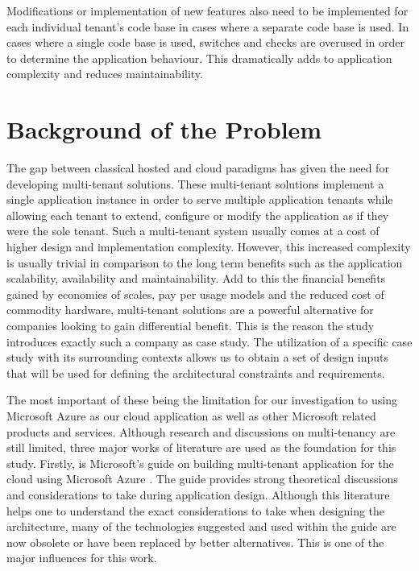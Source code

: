 Modifications or implementation of new features also need to be implemented for each individual tenant's code base in cases where a separate code base is used. In cases where a single code base is used, switches and checks are overused in order to determine the application behaviour. This dramatically adds to application complexity and reduces maintainability.

\section{Background of the Problem}
The gap between classical hosted and cloud paradigms has given the need for developing multi-tenant solutions. These multi-tenant solutions implement a single application instance in order to serve multiple application tenants while allowing each tenant to extend, configure or modify the application as if they were the sole tenant. Such a multi-tenant system usually comes at a cost of higher design and implementation complexity. However, this increased complexity is usually trivial in comparison to the long term benefits such as the application scalability, availability  and maintainability. Add to this the financial benefits gained by economies of scales, pay per usage models and the reduced cost of commodity hardware, multi-tenant solutions are a powerful alternative for companies looking to gain differential benefit. This is the reason the study introduces exactly such a company as case study. The utilization of a specific case study with its surrounding contexts allows us to obtain a set of design inputs that will be used for defining the architectural constraints and requirements. 

The most important of these being the limitation for our investigation to using Microsoft Azure as our cloud application as well as other Microsoft related products and services. Although research and discussions on multi-tenancy are still limited, three major works of literature are used as the foundation for this study. Firstly, is Microsoft's guide on building multi-tenant application for the cloud using Microsoft Azure \cite{Betts2012-ad}. The guide provides strong theoretical discussions and considerations to take during application design. Although this literature helps one to understand the exact considerations to take when designing the architecture, many of the technologies suggested and used within the guide are now obsolete or have been replaced by better alternatives. This is one of the major influences for this work.

